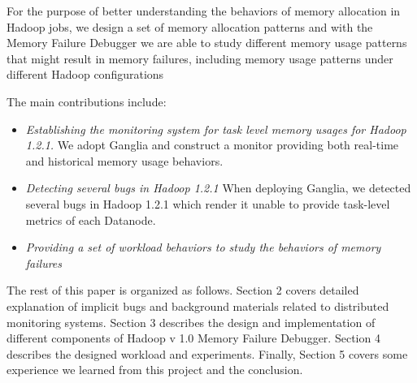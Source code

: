 \par
For the purpose of better understanding the behaviors of memory allocation in Hadoop jobs, we design a set of memory allocation patterns and with the Memory Failure Debugger we are able to study different memory usage patterns that might result in memory failures, including memory usage patterns under different Hadoop configurations
\par
The main contributions include:
\begin{itemize}
	\setlength{\itemsep}{1pt}
	 \setlength{\parskip}{0pt}
	 \setlength{\parsep}{0pt}
	\item
		\emph{ Establishing the monitoring system for task level memory usages for Hadoop 1.2.1.} We adopt Ganglia and construct a monitor providing both real-time and historical memory usage behaviors.
	\item
		\emph{ Detecting several bugs in Hadoop 1.2.1} When deploying Ganglia, we detected several bugs in Hadoop 1.2.1 which render it unable to provide task-level metrics of each Datanode.
	\item
		\emph{ Providing a set of workload behaviors to study the behaviors of memory failures}
\end{itemize}

The rest of this paper is organized as follows. Section 2 covers detailed explanation of implicit bugs and background materials related to distributed monitoring systems. Section 3 describes the design and implementation of different components of Hadoop v 1.0 Memory Failure Debugger. Section 4 describes the designed workload and experiments. Finally, Section 5 covers some experience we learned from this project and the conclusion.


